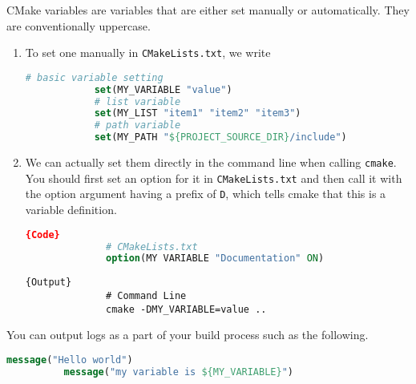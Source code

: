 \documentclass{article}
\begin{document}
      \begin{definition}
        CMake variables are variables that are either set manually or automatically. They are conventionally uppercase. 
        \begin{enumerate}
          \item To set one manually in \texttt{CMakeLists.txt}, we write 
          \begin{lstlisting}[language=CMake]
            # basic variable setting 
            set(MY_VARIABLE "value") 
            # list variable 
            set(MY_LIST "item1" "item2" "item3") 
            # path variable 
            set(MY_PATH "${PROJECT_SOURCE_DIR}/include")
          \end{lstlisting}

          \item We can actually set them directly in the command line when calling \texttt{cmake}. You should first set an option for it in \texttt{CMakeLists.txt} and then call it with the option argument having a prefix of \texttt{D}, which tells cmake that this is a variable definition. 
            
          \noindent\begin{minipage}{.47\textwidth}
            \begin{lstlisting}[language=CMake]{Code}
              # CMakeLists.txt
              option(MY VARIABLE "Documentation" ON)
            \end{lstlisting}
            \end{minipage}
            \hfill
            \begin{minipage}{.46\textwidth}
            \begin{lstlisting}[]{Output}
              # Command Line 
              cmake -DMY_VARIABLE=value ..
            \end{lstlisting}
          \end{minipage}

        \end{enumerate}
      \end{definition} 

      \begin{definition}[Message]
        You can output logs as a part of your build process such as the following. 
        \begin{lstlisting}[language=CMake]
          message("Hello world") 
          message("my variable is ${MY_VARIABLE}")
        \end{lstlisting}
      \end{definition}
\end{document}
